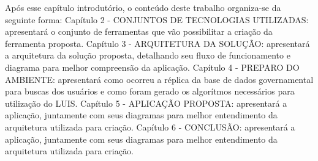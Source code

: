 Após esse capítulo introdutório, o conteúdo deste trabalho organiza-se da seguinte forma:
		Capítulo 2 - \uppercase{Conjuntos de tecnologias utilizadas}: apresentará o conjunto de ferramentas que vão possibilitar a criação da ferramenta proposta.
		Capítulo 3 - \uppercase{Arquitetura da solução}: apresentará a arquitetura da solução proposta, detalhando seu fluxo de funcionamento e diagrama para melhor compreensão da aplicação.
		Capítulo 4 - \uppercase{Preparo do ambiente}: apresentará como ocorreu a réplica da base de dados governamental para buscas dos usuários e como foram gerado os algorítmos necessários para utilização do LUIS.
		Capítulo 5 - \uppercase{Aplicação proposta}: apresentará a aplicação, juntamente com seus diagramas para melhor entendimento da arquitetura utilizada para criação.
		Capítulo 6 - \uppercase{Conclusão}: apresentará a aplicação, juntamente com seus diagramas para melhor entendimento da arquitetura utilizada para criação.
